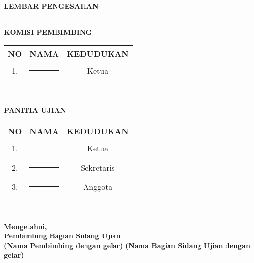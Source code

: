 \newpage


\begin{center}
    \begin{large}\textbf{ LEMBAR PENGESAHAN} \end{large} \\[2cm]

    \textbf{\normalsize KOMISI PEMBIMBING} \\[0.5cm]

    \begin{table}[H]
        \centering
        \begin{tabular}{|c|c|c|}
        \hline
        \textbf{NO} & \textbf{NAMA} & \textbf{KEDUDUKAN} \\ \hline
        1. & \rule{6cm}{0.15mm} & Ketua \\ \hline
    \end{tabular} \\[2cm]
    \end{table}
    

    \textbf{\normalsize PANITIA UJIAN} \\[0.5cm]

    \begin{table}[H]
    \centering
    \begin{tabular}{|c|c|c|}
    \hline
        \textbf{NO} & \textbf{NAMA} & \textbf{KEDUDUKAN} \\ \hline
        1. & \rule{6cm}{0.15mm} & Ketua \\ \hline
        2. & \rule{6cm}{0.15mm} & Sekretaris \\ \hline
        3. & \rule{6cm}{0.15mm} & Anggota \\ \hline
    \end{tabular} \\[2cm]
    \end{table}

    \textbf{\normalsize Mengetahui,} \\[1cm]
    \hspace{1cm} \textbf{\normalsize Pembimbing} \hspace{3cm} \textbf{\normalsize Bagian Sidang Ujian} \\ [2cm]
    \textbf{\footnotesize (Nama Pembimbing dengan gelar)} \textbf{\footnotesize (Nama Bagian Sidang Ujian dengan gelar)} \\
\end{center}
